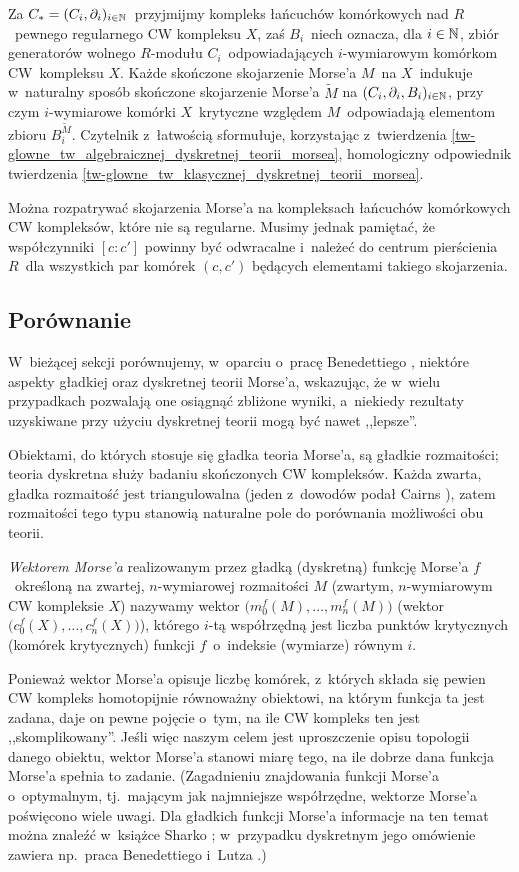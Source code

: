 Za $C_*=(C_i,\partial_i)_{i\in\mathbb{N}}$~przyjmijmy kompleks łańcuchów komórkowych \cite[Section 2.2]{Hatcher02} nad $R$~pewnego regularnego CW kompleksu $X$, zaś $B_i$~niech oznacza, dla $i\in \mathbb{N}$, zbiór generatorów wolnego $R$-modułu $C_i$~odpowiadających \mbox{$i$-wymiarowym} komórkom CW~kompleksu $X$. Każde skończone skojarzenie Morse'a $M$~na $X$~indukuje w~naturalny sposób skończone skojarzenie Morse'a $\widetilde{M}$ na $(C_i,\partial_i,B_i)_{i\in\mathbb{N}}$, przy czym \mbox{$i$-wymiarowe} komórki $X$~krytyczne względem $M$~odpowiadają elementom zbioru $B_i^{\widetilde{M}}$. Czytelnik z~łatwością sformułuje, korzystając z~twierdzenia \ref{tw-glowne_tw_algebraicznej_dyskretnej_teorii_morsea}, homologiczny odpowiednik twierdzenia \ref{tw-glowne_tw_klasycznej_dyskretnej_teorii_morsea}. 

Można rozpatrywać skojarzenia Morse'a na kompleksach łańcuchów komórkowych CW kompleksów, które nie są regularne. Musimy jednak pamiętać, że współczynniki $[c:c']$ powinny być odwracalne i~należeć do centrum pierścienia $R$~dla wszystkich par komórek $(c,c')$ będących elementami takiego skojarzenia.

\subsection{Porównanie}
W~bieżącej sekcji porównujemy, w~oparciu o~pracę Benedettiego \cite{Benedetti13}, niektóre aspekty gładkiej oraz dyskretnej teorii Morse'a, wskazując, że w~wielu przypadkach pozwalają one osiągnąć zbliżone wyniki, a~niekiedy rezultaty uzyskiwane przy użyciu dyskretnej teorii mogą być nawet ,,lepsze''. 

Obiektami, do których stosuje się gładka teoria Morse'a, są gładkie rozmaitości; teoria dyskretna służy badaniu skończonych CW kompleksów. Każda zwarta, gładka rozmaitość jest triangulowalna (jeden z~dowodów podał Cairns \cite{Cairns61}), zatem rozmaitości tego typu stanowią naturalne pole do porównania możliwości obu teorii.

\textit{Wektorem Morse'a} realizowanym przez gładką (dyskretną) funkcję Morse'a $f$~określoną na zwartej, $n$-wymiarowej rozmaitości $M$ (zwartym, $n$-wymiarowym CW kompleksie $X$) nazywamy wektor $\bigl(m_0^f(M),\ldots,m_n^f(M)\bigr)$ (wektor $\bigl(c_0^f(X),\ldots,c_n^f(X)\bigr)$), którego $i$-tą współrzędną jest liczba punktów krytycznych (komórek krytycznych) funkcji $f$~o~indeksie (wymiarze) równym $i$.

Ponieważ wektor Morse'a opisuje liczbę komórek, z~których składa się pewien CW kompleks homotopijnie równoważny obiektowi, na którym funkcja ta jest zadana, daje on pewne pojęcie o~tym, na ile CW kompleks ten jest ,,skomplikowany''. Jeśli więc naszym celem jest uproszczenie opisu topologii danego obiektu, wektor Morse'a stanowi miarę tego, na ile dobrze dana funkcja Morse'a spełnia to zadanie. (Zagadnieniu znajdowania funkcji Morse'a o~optymalnym, tj.~mającym jak najmniejsze współrzędne, wektorze Morse'a poświęcono wiele uwagi. Dla gładkich funkcji Morse'a informacje na ten temat można znaleźć w~książce Sharko \cite{Sharko93}; w~przypadku dyskretnym jego omówienie zawiera np.~praca Benedettiego i~Lutza \cite{Benedetti14}.)

